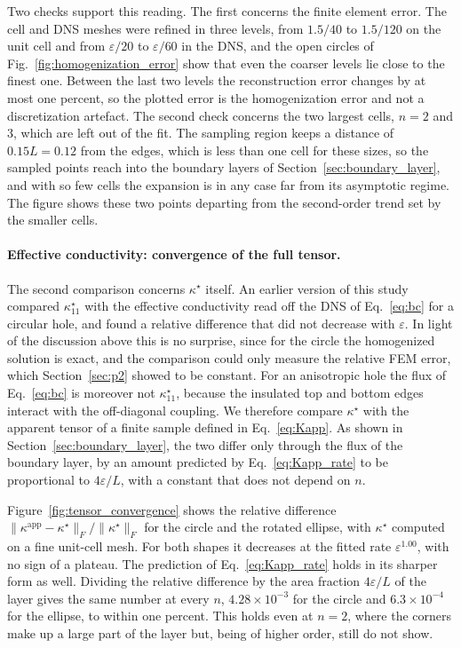 \documentclass{article}
\begin{document}
Two checks support this reading. The first concerns the finite element error. The cell
and DNS meshes were refined in three levels, from $1.5/40$ to $1.5/120$ on the unit cell
and from $\varepsilon/20$ to $\varepsilon/60$ in the DNS, and the open circles of
Fig.~\ref{fig:homogenization_error} show that even the coarser levels lie close to the
finest one. Between the last two levels the reconstruction error changes by at most one
percent, so the plotted error is the homogenization error and not a discretization
artefact. The second check concerns the two largest cells, $n = 2$ and $3$, which are
left out of the fit. The sampling region keeps a distance of $0.15 L = 0.12$ from the
edges, which is less than one cell for these sizes, so the sampled points reach into the
boundary layers of Section~\ref{sec:boundary_layer}, and with so few cells the expansion
is in any case far from its asymptotic regime. The figure shows these two points
departing from the second-order trend set by the smaller cells.

\paragraph{Effective conductivity: convergence of the full tensor.} The second
comparison concerns $\kappa^{\star}$ itself. An earlier version of this study compared
$\kappa^{\star}_{11}$ with the effective conductivity read off the DNS of
Eq.~\eqref{eq:bc} for a circular hole, and found a relative difference that did not
decrease with $\varepsilon$. In light of the discussion above this is no surprise, since
for the circle the homogenized solution is exact, and the comparison could only measure
the relative FEM error, which Section~\ref{sec:p2} showed to be constant. For an
anisotropic hole the flux of Eq.~\eqref{eq:bc} is moreover not $\kappa^{\star}_{11}$,
because the insulated top and bottom edges interact with the off-diagonal coupling. We
therefore compare $\kappa^{\star}$ with the apparent tensor of a finite sample defined in
Eq.~\eqref{eq:Kapp}. As shown in Section~\ref{sec:boundary_layer}, the two differ only
through the flux of the boundary layer, by an amount predicted by
Eq.~\eqref{eq:Kapp_rate} to be proportional to $4\varepsilon/L$, with a constant that
does not depend on $n$.

Figure~\ref{fig:tensor_convergence} shows the relative difference
$\|\kappa^{\mathrm{app}} - \kappa^{\star}\|_F / \|\kappa^{\star}\|_F$ for the circle and
the rotated ellipse, with $\kappa^{\star}$ computed on a fine unit-cell mesh. For both
shapes it decreases at the fitted rate $\varepsilon^{1.00}$, with no sign of a plateau.
The prediction of Eq.~\eqref{eq:Kapp_rate} holds in its sharper form as well. Dividing
the relative difference by the area fraction $4\varepsilon/L$ of the layer gives the same
number at every $n$, $4.28\times10^{-3}$ for the circle and $6.3\times10^{-4}$ for the
ellipse, to within one percent. This holds even at $n = 2$, where the corners make up a
large part of the layer but, being of higher order, still do not show.
\end{document}
